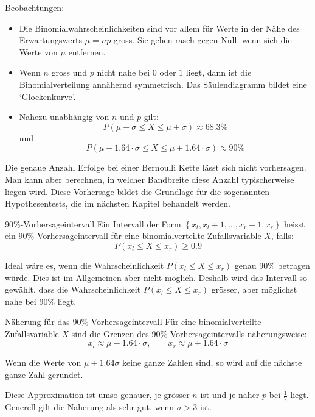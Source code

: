 \clearpage
Beobachtungen:
\begin{itemize}
    \item Die Binomialwahrscheinlichkeiten sind vor allem für Werte in der Nähe des Erwartungswerts \(\mu = np\) gross. Sie gehen rasch gegen Null, wenn sich die Werte von \(\mu\) entfernen.
    \item Wenn \(n\) gross und \(p\) nicht nahe bei \(0\) oder \(1\) liegt, dann ist die Binomialverteilung annähernd symmetrisch. Das Säulendiagramm bildet eine `Glockenkurve'.
    \item Nahezu unabhängig von \(n\) und \(p\) gilt:
          \[ P(\mu - \sigma \le X \le \mu + \sigma) \approx 68.3\%\]
          und
          \[ P(\mu - 1.64 \cdot \sigma \le X \le \mu + 1.64 \cdot \sigma) \approx 90\%\]

\end{itemize}

Die genaue Anzahl Erfolge bei einer Bernoulli Kette lässt sich nicht vorhersagen. Man kann aber berechnen, in welcher Bandbreite diese Anzahl typischerweise liegen wird.  Diese Vorhersage bildet die Grundlage für die sogenannten Hypothesentests, die im nächsten Kapitel behandelt werden.

\begin{definition}
    {90\%-Vorhersageintervall}{}
    Ein Intervall der Form \(\left\{x_l, x_l+1, \dots , x_r-1, x_r \right\}\) heisst ein \(90\%\)-Vorhersageintervall für eine binomialverteilte Zufallsvariable \(X\), falls:
    \[P(x_l \le X \le x_r) \ge 0.9\]
\end{definition}

Ideal wäre es, wenn die Wahrscheinlichkeit \(P(x_l \le X \le x_r)\) genau 90\% betragen würde. Dies ist im Allgemeinen aber nicht möglich. Deshalb wird das Intervall so gewählt, dass die Wahrscheinlichkeit \(P(x_l \le X \le x_r)\) grösser, aber möglichst nahe bei 90\% liegt.

\begin{satz}
    {Näherung für das 90\%-Vorhersageintervall}{}
    Für eine binomialverteilte Zufallsvariable \(X\) sind die Grenzen des 90\%-Vorhersageintervalls näherungsweise:
    \[x_l \approx \mu - 1.64 \cdot \sigma, \qquad x_r \approx \mu + 1.64 \cdot \sigma\]

    \bigskip

    Wenn die Werte von \(\mu \pm 1.64\sigma\) keine ganze Zahlen sind, so wird auf die nächste ganze Zahl gerundet.

    \bigskip

    Diese Approximation ist umso genauer, je grösser \(n\) ist und je näher \(p\) bei \(\frac{1}{2}\) liegt. Generell gilt die Näherung als sehr gut, wenn \(\sigma >3\) ist.
\end{satz}


